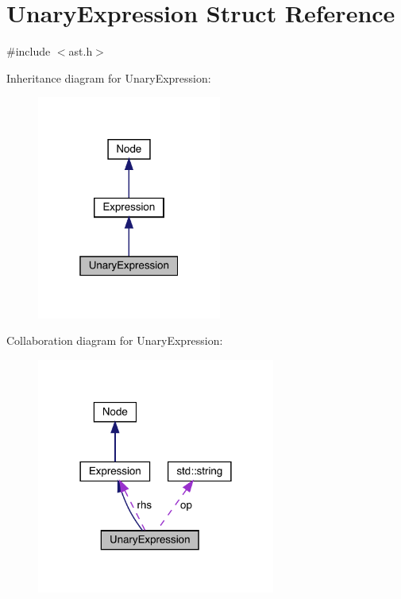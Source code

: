 \hypertarget{struct_unary_expression}{}\section{Unary\+Expression Struct Reference}
\label{struct_unary_expression}


{\ttfamily \#include $<$ast.\+h$>$}



Inheritance diagram for Unary\+Expression\+:
\nopagebreak
\begin{figure}[H]
\begin{center}
\leavevmode
\includegraphics[width=172pt]{struct_unary_expression__inherit__graph}
\end{center}
\end{figure}


Collaboration diagram for Unary\+Expression\+:
\nopagebreak
\begin{figure}[H]
\begin{center}
\leavevmode
\includegraphics[width=222pt]{struct_unary_expression__coll__graph}
\end{center}
\end{figure}
